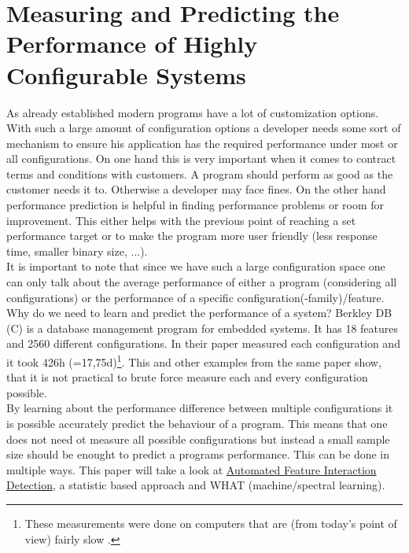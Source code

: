 \section{Measuring and Predicting the Performance of Highly Configurable Systems}

As already established modern programs have a lot of customization options.
With such a large amount of configuration options a developer needs some sort of mechanism to ensure his application has the required performance under most or all configurations. On one hand this is very important when it comes to contract terms and conditions with customers. A program should perform as good as the customer needs it to. Otherwise a developer may face fines. On the other hand performance prediction is helpful in finding performance problems or room for improvement. This either helps with the previous point of reaching a set performance target or to make the program more user friendly (less response time, smaller binary size, ...).\\
It is important to note that since we have such a large configuration space one can only talk about the average performance of either a program (considering all configurations) or the performance of a specific configuration(-family)/feature.\\
Why do we need to learn and predict the performance of a system? Berkley DB (C) is a database management program for embedded systems. It has 18 features and 2560 different configurations. In their paper  \citet{AutomatedFeatureDetectionSiegmund2012} measured each configuration and it took 426h (=17,75d)\footnote{These measurements were done on computers that are (from today's point of view) fairly slow \cite{AutomatedFeatureDetectionSiegmund2012,CPUDatabase}. }. This and other examples from the same paper show, that it is not practical to brute force measure each and every configuration possible.\\
By learning about the performance difference between multiple configurations it is possible accurately predict the behaviour of a program. This means that one does not need ot measure all possible configurations but instead a small sample size should be enought to predict a programs performance. This can be done in multiple ways. This paper will take a look at \hyperref[sec:AFID]{Automated Feature Interaction Detection}, a statistic based approach and WHAT (machine/spectral learning).

%






